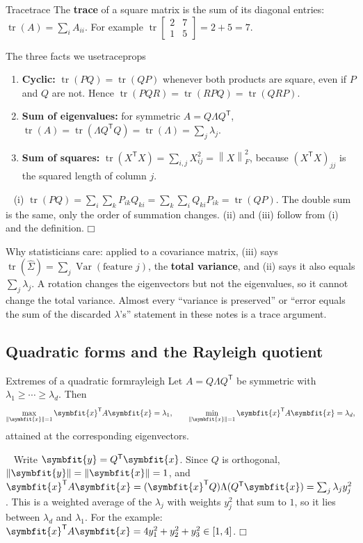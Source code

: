 \documentclass[11pt]{article}
\newcommand{\bm}[1]{\symbfit{#1}}
\newenvironment{proofsketch}{\par\noindent{\itshape Proof.}\ }{\hfill$\mdlgwhtsquare$\par}
\newcommand{\vx}{\bm{x}}
\newcommand{\vy}{\bm{y}}
\newcommand{\Sig}{\widehat{\Sigma}}
\newcommand{\T}{^{\mathsf T}}
\newcommand{\tr}{\operatorname{tr}}
\newcommand{\norm}[1]{\left\lVert #1\right\rVert}
\newcommand{\Fro}[1]{\left\lVert #1\right\rVert_F}
\begin{document}
\begin{definition}{Trace}{trace}
The \textbf{trace} of a square matrix is the sum of its diagonal entries:
$\tr(A)=\sum_{i}A_{ii}$. For example $\tr\begin{bmatrix}2&7\\1&5\end{bmatrix}=2+5=7$.
\end{definition}

\begin{proposition}{The three facts we use}{traceprops}
\begin{enumerate}[nosep,label=(\roman*)]
\item \textbf{Cyclic:} $\tr(PQ)=\tr(QP)$ whenever both products are square, even if $P$ and $Q$ are not. Hence $\tr(PQR)=\tr(RPQ)=\tr(QRP)$.
\item \textbf{Sum of eigenvalues:} for symmetric $A=Q\Lambda Q\T$, $\tr(A)=\tr(\Lambda Q\T Q)=\tr(\Lambda)=\sum_j\lambda_j$.
\item \textbf{Sum of squares:} $\tr(X\T X)=\sum_{i,j}X_{ij}^2=\Fro{X}^2$, because $(X\T X)_{jj}$ is the squared length of column $j$.
\end{enumerate}
\end{proposition}
\begin{proofsketch}
(i) $\tr(PQ)=\sum_i\sum_kP_{ik}Q_{ki}=\sum_k\sum_iQ_{ki}P_{ik}=\tr(QP)$. The double sum is the same,
only the order of summation changes. (ii) and (iii) follow from (i) and the definition.
\end{proofsketch}

\begin{intuition}
Why statisticians care: applied to a covariance matrix, (iii) says
$\tr(\Sig)=\sum_j\operatorname{Var}(\text{feature }j)$, the \textbf{total variance}, and (ii) says
it also equals $\sum_j\lambda_j$. A rotation changes the eigenvectors but not the eigenvalues,
so it cannot change the total variance. Almost every ``variance is preserved'' or ``error equals
the sum of the discarded $\lambda$'s'' statement in these notes is a trace argument.
\end{intuition}

\subsection{Quadratic forms and the Rayleigh quotient}

\begin{proposition}{Extremes of a quadratic form}{rayleigh}
Let $A=Q\Lambda Q\T$ be symmetric with $\lambda_1\ge\cdots\ge\lambda_d$. Then
\[
\max_{\norm{\vx}=1}\vx\T A\vx=\lambda_1, \qquad \min_{\norm{\vx}=1}\vx\T A\vx=\lambda_d,
\]
attained at the corresponding eigenvectors.
\end{proposition}
\begin{proofsketch}
Write $\vy=Q\T\vx$. Since $Q$ is orthogonal, $\norm{\vy}=\norm{\vx}=1$, and
$\vx\T A\vx=(\vx\T Q)\Lambda(Q\T\vx)=\sum_j\lambda_j y_j^2$. This is a weighted
average of the $\lambda_j$ with weights $y_j^2$ that sum to $1$, so it lies between
$\lambda_d$ and $\lambda_1$. For the example: $\vx\T A\vx=4y_1^2+y_2^2+y_3^2\in[1,4]$.
\end{proofsketch}
\end{document}
